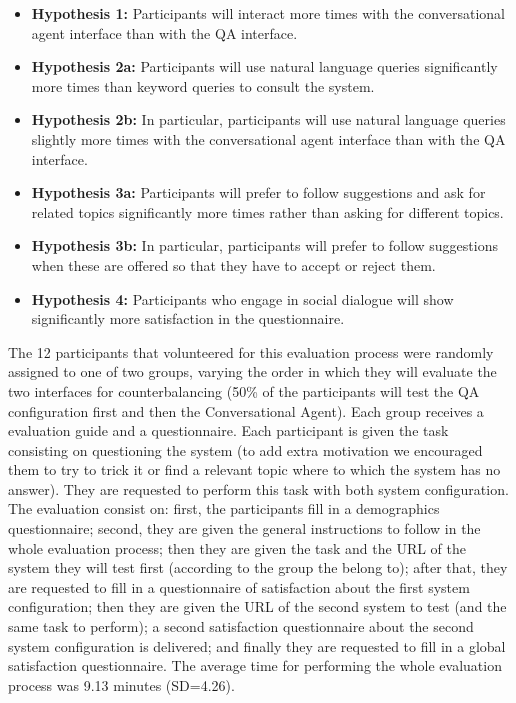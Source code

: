\begin{itemize}
  \item \textbf{Hypothesis 1:} Participants will interact more times with the conversational agent interface than with the \ac{QA} interface.    
  \item \textbf{Hypothesis 2a:} Participants will use natural language queries significantly more times than keyword queries to consult the system.
  \item \textbf{Hypothesis 2b:} In particular, participants will use natural language queries slightly more times with the conversational agent interface than with the \ac{QA} interface.
  \item \textbf{Hypothesis 3a:} Participants will prefer to follow suggestions and ask for related topics significantly more times rather than asking for different topics.
  \item \textbf{Hypothesis 3b:} In particular, participants will prefer to follow suggestions when these are offered so that they have to accept or reject them.
  \item \textbf{Hypothesis 4:} Participants who engage in social dialogue will show significantly more satisfaction in the questionnaire.  
\end{itemize}

The 12 participants that volunteered for this evaluation process were randomly assigned to one of two groups, varying the order in which they will evaluate the two interfaces for counterbalancing (50\% of the participants will test the \ac{QA} configuration first and then the Conversational Agent). Each group receives a evaluation guide and a questionnaire. Each participant is given the task consisting on questioning the system (to add extra motivation we encouraged them to try to trick it or find a relevant topic where to which the system has no answer). They are requested to perform this task with both system configuration.
The evaluation consist on: first, the participants fill in a demographics questionnaire; second, they are given the general instructions to follow in the whole evaluation process; then they are given the task and the URL of the system they will test first (according to the group the belong to); after that, they are requested to fill in a questionnaire of satisfaction about the first system configuration; then they are given the URL of the second system to test (and the same task to perform); a second satisfaction questionnaire about the second system configuration is delivered; and finally they are requested to fill in a global satisfaction questionnaire. The average time for performing the whole evaluation process was 9.13 minutes (SD=4.26).


